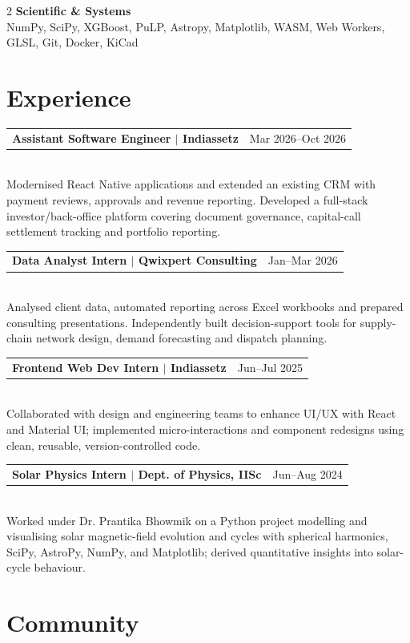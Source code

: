 \documentclass[letterpaper,10pt]{article}
\makeatletter
\newcommand{\entry}[2]{%
  \vspace{1pt}
  \begin{tabular*}{\linewidth}{@{}l@{\extracolsep{\fill}}r@{}}
    \small\textbf{#1} & \footnotesize #2
  \end{tabular*}\vspace{-4pt}
}
\makeatother
\begin{document}
\begin{paracol}{2}
{\small\textbf{Scientific \& Systems}}\\[2pt]
{\small NumPy, SciPy, XGBoost, PuLP, Astropy, Matplotlib, WASM, Web Workers, GLSL, Git, Docker, KiCad}

\section{Experience}

\entry{Assistant Software Engineer $|$ Indiassetz}{Mar 2026--Oct 2026}\\[4pt]
{\small Modernised React Native applications and extended an existing CRM with payment reviews, approvals and revenue reporting. Developed a full-stack investor/back-office platform covering document governance, capital-call settlement tracking and portfolio reporting.}

\vspace{4pt}

\entry{Data Analyst Intern $|$ Qwixpert Consulting}{Jan--Mar 2026}\\[4pt]
{\small Analysed client data, automated reporting across Excel workbooks and prepared consulting presentations. Independently built decision-support tools for supply-chain network design, demand forecasting and dispatch planning.}

\vspace{4pt}

\entry{Frontend Web Dev Intern $|$ Indiassetz}{Jun--Jul 2025}\\[4pt]
{\small Collaborated with design and engineering teams to enhance UI/UX with React and Material UI; implemented micro-interactions and component redesigns using clean, reusable, version-controlled code.}

\vspace{4pt}

\entry{Solar Physics Intern $|$ Dept. of Physics, IISc}{Jun--Aug 2024}\\[4pt]
{\small Worked under Dr. Prantika Bhowmik on a Python project modelling and visualising solar magnetic-field evolution and cycles with spherical harmonics, SciPy, AstroPy, NumPy, and Matplotlib; derived quantitative insights into solar-cycle behaviour.}

\vspace{4pt}

\switchcolumn

\section{Community}


\end{paracol}
\end{document}
